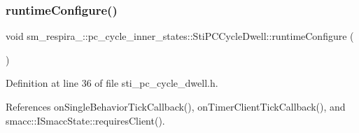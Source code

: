 \subsubsection{\texorpdfstring{runtime\+Configure()}{runtimeConfigure()}}
{\footnotesize\ttfamily void sm\+\_\+respira\+\_\+::pc\+\_\+cycle\+\_\+inner\+\_\+states\+::\+Sti\+P\+C\+Cycle\+Dwell\+::runtime\+Configure (\begin{DoxyParamCaption}{ }\end{DoxyParamCaption})\hspace{0.3cm}{\ttfamily [inline]}}



Definition at line 36 of file sti\+\_\+pc\+\_\+cycle\+\_\+dwell.\+h.



References on\+Single\+Behavior\+Tick\+Callback(), on\+Timer\+Client\+Tick\+Callback(), and smacc\+::\+I\+Smacc\+State\+::requires\+Client().


